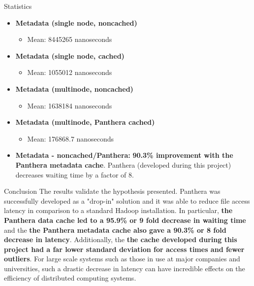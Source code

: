 \documentclass[final]{beamer} %
\begin{document}
\begin{frame}
\begin{columns}[t]
\begin{column}{0.32\textwidth}
\begin{block}{Statistics}
\begin{itemize}
    		\item \textbf{Metadata (single node, noncached)}
    		\begin{itemize}
    			\item Mean: 8445265 nanoseconds
    		\end{itemize}
    		
    		\item \textbf{Metadata (single node, cached)}
    		\begin{itemize}
    			\item Mean: 1055012 nanoseconds
    		\end{itemize}
    		
    		\item \textbf{Metadata (multinode, noncached)}
		\begin{itemize}
			\item Mean: 1638184 nanoseconds    		
    		\end{itemize}
    		
    		\item \textbf{Metadata (multinode, Panthera cached)}
    		\begin{itemize}
			\item Mean: 176868.7 nanoseconds    		
    		\end{itemize}
    		
    		\item \textbf{Metadata - noncached/Panthera: } \textbf{90.3\% improvement with the Panthera metadata cache}. Panthera (developed during this project) decreases waiting time by a factor of 8.
    		
	\end{itemize}    	    
    \end{block}
    
    	\begin{block}{Conclusion}
	The results validate the hypothesis presented. Panthera was successfully developed as a "drop-in" solution and it was able to reduce file access latency in comparison to a standard Hadoop installation. In particular, \textbf{the Panthera data cache led to a 95.9\% or 9 fold decrease in waiting time} and the \textbf{the Panthera metadata cache also gave a 90.3\% or 8 fold decrease in latency}. Additionally, the \textbf{the cache developed during this project had a far lower standard deviation for access times and fewer outliers}. For large scale systems such as those in use at major companies and universities, such a drastic decrease in latency can have incredible effects on the efficiency of distributed computing systems.
	

\end{block}
\end{column}
\end{columns}
\end{frame}
\end{document}
